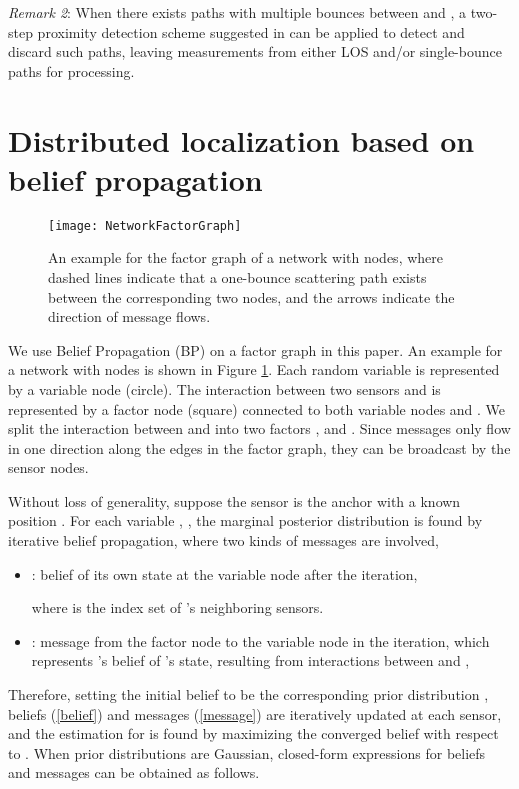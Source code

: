 \documentclass[10pt, twocolumn, final]{IEEEtran}
\begin{document}
\emph{Remark 2}: When there exists paths with multiple bounces between  and , a two-step proximity detection scheme suggested in \cite{Seow2008} can be applied to detect and discard such paths, leaving measurements from either LOS and/or single-bounce paths for processing.

\section{Distributed localization based on belief propagation}\label{Section:DistributedLocalization}
\begin{figure}[!t]
\centering
\texttt{[image: NetworkFactorGraph]}
\caption{An example for the factor graph of a network with  nodes, where dashed lines indicate that a one-bounce scattering path exists between the corresponding two nodes, and the arrows indicate the direction of message flows.} \label{Figure-FG}
\end{figure}

We use Belief Propagation (BP) on a factor graph\cite{Kschischang2001} in this paper. An example for a network with  nodes is shown in Figure \ref{Figure-FG}. Each random variable  is represented by a variable node (circle). The interaction between two sensors  and  is represented by a factor node (square) connected to both variable nodes  and . We split the interaction between  and  into two factors , and . Since messages only flow in one direction along the edges in the factor graph, they can be broadcast by the sensor nodes.

Without loss of generality, suppose the sensor  is the anchor with a known position . For each variable , , the marginal posterior distribution  is found by iterative belief propagation, where two kinds of messages are involved,
\begin{itemize}
\item{: belief of its own state at the variable node  after the  iteration,

where  is the index set of 's neighboring sensors.}
\item{: message from the factor node  to the variable node  in the  iteration, which represents 's belief of 's state, resulting from interactions between  and ,
}
\end{itemize}
Therefore, setting the initial belief  to be the corresponding prior distribution , beliefs (\ref{belief}) and messages (\ref{message}) are iteratively updated at each sensor, and the estimation for  is found by maximizing the converged belief  with respect to . When prior distributions  are Gaussian, closed-form expressions for beliefs and messages can be obtained as follows.
\end{document}
